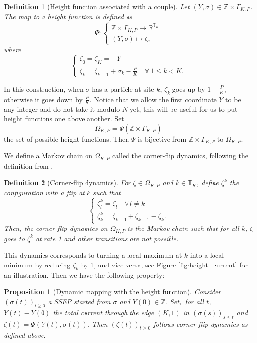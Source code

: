 \documentclass[11pt,a4paper]{article}
\newcommand{\R}{\mathbb{R}}
\newcommand{\Z}{\mathbb{Z}}
\newcommand{\T}{\mathbb{T}}
\newtheorem{proposition}[theorem]{Proposition}
\newtheorem{definition}{Definition}[section]
\newcommand{\eqs}[1]{\begin{equation}#1\end{equation}}
\begin{document}
\begin{definition}[Height function associated with a couple] Let $(Y, \sigma) \in \Z \times \Gamma_{K,P}$. The map to a height function is defined as
\begin{equation}
 	\Psi:
    \begin{cases}
        \Z \times \Gamma_{K,P} \to \R^{\T_K}\\
        (Y,\sigma) \mapsto  \zeta,
    \end{cases}       
    \end{equation}
where
 \begin{equation}
    \begin{cases}
        \zeta_0 =\zeta_K = - Y\\
        \zeta_k = \zeta_{k-1} +  \sigma_k-\frac{P}{K} \quad \forall \, 1\le k<K.
    \end{cases}       
    \end{equation}
\end{definition} 
In this construction, when $\sigma$ has a particle at site $k$, $\zeta_k$ goes up by $1-\frac{P}{K}$, otherwise it goes down by $\frac{P}{K}$. Notice that we allow the first coordinate $Y$ to be any integer and do not take it modulo $N$ yet, this will be useful for us to put height functions one above another. Set 
 \eqs{\Omega_{K,P} = \Psi(\Z \times \Gamma_{K,P})}
 the set of possible height functions. Then $\Psi$ is bijective from $\Z \times \Gamma_{K,P}$ to $\Omega_{K,P}$.

We define a Markov chain on $\Omega_{K,P}$ called the corner-flip dynamics, following the definition from \cite[Section 5]{lacoin_simple_2017}.
\begin{definition}[Corner-flip dynamics]
For $\zeta \in \Omega_{K,P}$ and $k \in \T_K$, define $\zeta^k$ the configuration with a flip at $k$ such that 
\begin{equation}
    \begin{cases}
        \zeta^k_l =\zeta_l \quad \forall \, l \neq k\\
        \zeta^k_k = \zeta_{k+1} + \zeta_{k-1} - \zeta_k.
    \end{cases} 
    \end{equation}
    Then, the corner-flip dynamics on $\Omega_{K,P}$ is the Markov chain such that for all $k$, $\zeta$ goes to $\zeta^k$ at rate 1 and other transitions are not possible. 
\end{definition}
This dynamics corresponds to turning a local maximum at $k$ into a local minimum by reducing $\zeta_k$ by 1, and vice versa, see Figure \ref{fig:height_current} for an illustration. Then we have the following property:
 \begin{proposition}[Dynamic mapping with the height function]\label{prop:map_height}
 Consider $(\sigma(t))_{t\ge 0}$ a SSEP started from $\sigma$ and $Y(0) \in \mathbb{Z}$. Set, for all $t$, $Y(t) - Y(0)$ the total current through the edge $(K,1)$ in $(\sigma(s))_{s\le t}$ and $\zeta(t) = \Psi(Y(t),\sigma(t))$. Then $(\zeta(t))_{t\ge 0}$ follows corner-flip dynamics as defined above.
 \end{proposition}
 
\end{document}
